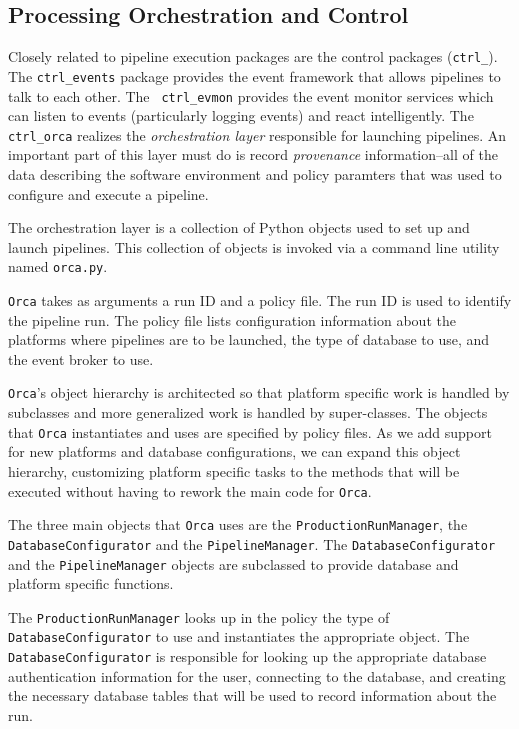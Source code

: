 
\subsection{Processing Orchestration and Control}

Closely related to pipeline execution packages are the control
packages ({\tt ctrl\_}).  The {\tt ctrl\_events} package provides the
event framework that allows pipelines to talk to each other.  The {\tt
ctrl\_evmon} provides the event monitor services which can listen to
events (particularly logging events) and react intelligently.  The
{\tt ctrl\_orca} realizes the {\it orchestration layer} responsible
for launching pipelines.  An important part of this layer must do is
record {\it provenance} information--all of the data describing the
software environment and policy paramters that was used to configure
and execute a pipeline.  

 \label{sec:PipelineOrchestration}

The orchestration layer is a collection of Python objects used to set up and
launch pipelines. This collection of objects is invoked via a command line
utility named \texttt{orca.py}.

\texttt{Orca} takes as arguments a run ID and a policy file. The run ID is used
to identify the pipeline run. The policy file lists configuration information
about the platforms where pipelines are to be launched, the type of database to
use, and the event broker to use.

\texttt{Orca}'s object hierarchy is architected so that platform specific work
is handled by subclasses and more generalized work is handled by super-classes.
The objects that \texttt{Orca} instantiates and uses are specified by policy
files. As we add support for new platforms and database configurations, we can
expand this object hierarchy, customizing platform specific tasks to the methods
that will be executed without having to rework the main code for \texttt{Orca}.

The three main objects that \texttt{Orca} uses are the
\texttt{ProductionRunManager}, the \texttt{DatabaseConfig\-urator} and the
\texttt{PipelineManager}.  The \texttt{DatabaseConfigurator} and the
\texttt{PipelineManager} objects are subclassed to provide database and platform
specific functions.

The \texttt{ProductionRunManager} looks up in the policy the type of
\texttt{DatabaseConfigurator} to use and instantiates the appropriate object.
The \texttt{DatabaseConfigurator} is responsible for looking up the appropriate
database authentication information for the user, connecting to the database,
and creating the necessary database tables that will be used to record
information about the run.


